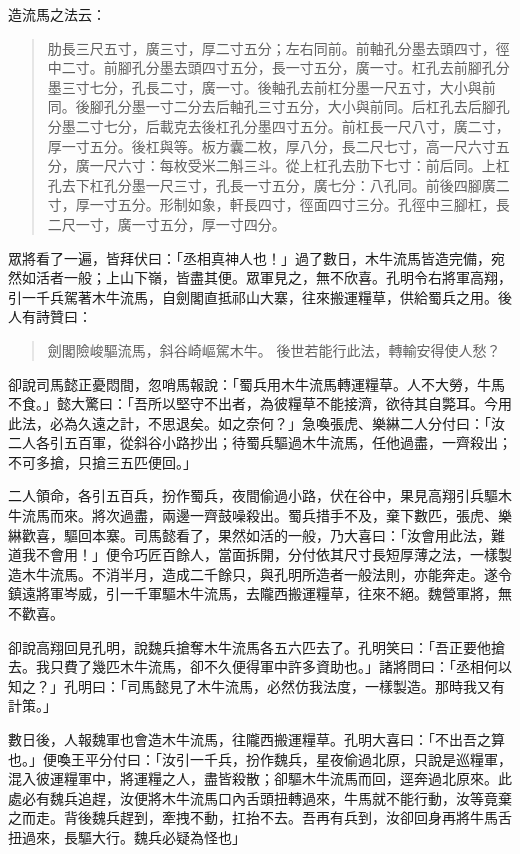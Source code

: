 造流馬之法云：

\begin{quote}
肋長三尺五寸，廣三寸，厚二寸五分；左右同前。前軸孔分墨去頭四寸，徑中二寸。前腳孔分墨去頭四寸五分，長一寸五分，廣一寸。杠孔去前腳孔分墨三寸七分，孔長二寸，廣一寸。後軸孔去前杠分墨一尺五寸，大小與前同。後腳孔分墨一寸二分去后軸孔三寸五分，大小與前同。后杠孔去后腳孔分墨二寸七分，后載克去後杠孔分墨四寸五分。前杠長一尺八寸，廣二寸，厚一寸五分。後杠與等。板方囊二枚，厚八分，長二尺七寸，高一尺六寸五分，廣一尺六寸：每枚受米二斛三斗。從上杠孔去肋下七寸：前后同。上杠孔去下杠孔分墨一尺三寸，孔長一寸五分，廣七分：八孔同。前後四腳廣二寸，厚一寸五分。形制如象，軒長四寸，徑面四寸三分。孔徑中三腳杠，長二尺一寸，廣一寸五分，厚一寸四分。
\end{quote}

眾將看了一遍，皆拜伏曰：「丞相真神人也！」過了數日，木牛流馬皆造完備，宛然如活者一般；上山下嶺，皆盡其便。眾軍見之，無不欣喜。孔明令右將軍高翔，引一千兵駕著木牛流馬，自劍閣直抵祁山大寨，往來搬運糧草，供給蜀兵之用。後人有詩贊曰：

\begin{quote}
劍閣險峻驅流馬，斜谷崎嶇駕木牛。
後世若能行此法，轉輸安得使人愁？
\end{quote}

卻說司馬懿正憂悶間，忽哨馬報說：「蜀兵用木牛流馬轉運糧草。人不大勞，牛馬不食。」懿大驚曰：「吾所以堅守不出者，為彼糧草不能接濟，欲待其自斃耳。今用此法，必為久遠之計，不思退矣。如之奈何？」急喚張虎、樂綝二人分付曰：「汝二人各引五百軍，從斜谷小路抄出；待蜀兵驅過木牛流馬，任他過盡，一齊殺出；不可多搶，只搶三五匹便回。」

二人領命，各引五百兵，扮作蜀兵，夜間偷過小路，伏在谷中，果見高翔引兵驅木牛流馬而來。將次過盡，兩邊一齊鼓噪殺出。蜀兵措手不及，棄下數匹，張虎、樂綝歡喜，驅回本寨。司馬懿看了，果然如活的一般，乃大喜曰：「汝會用此法，難道我不會用！」便令巧匠百餘人，當面拆開，分付依其尺寸長短厚薄之法，一樣製造木牛流馬。不消半月，造成二千餘只，與孔明所造者一般法則，亦能奔走。遂令鎮遠將軍岑威，引一千軍驅木牛流馬，去隴西搬運糧草，往來不絕。魏營軍將，無不歡喜。

卻說高翔回見孔明，說魏兵搶奪木牛流馬各五六匹去了。孔明笑曰：「吾正要他搶去。我只費了幾匹木牛流馬，卻不久便得軍中許多資助也。」諸將問曰：「丞相何以知之？」孔明曰：「司馬懿見了木牛流馬，必然仿我法度，一樣製造。那時我又有計策。」

數日後，人報魏軍也會造木牛流馬，往隴西搬運糧草。孔明大喜曰：「不出吾之算也。」便喚王平分付曰：「汝引一千兵，扮作魏兵，星夜偷過北原，只說是巡糧軍，混入彼運糧軍中，將運糧之人，盡皆殺散；卻驅木牛流馬而回，逕奔過北原來。此處必有魏兵追趕，汝便將木牛流馬口內舌頭扭轉過來，牛馬就不能行動，汝等竟棄之而走。背後魏兵趕到，牽拽不動，扛抬不去。吾再有兵到，汝卻回身再將牛馬舌扭過來，長驅大行。魏兵必疑為怪也」

